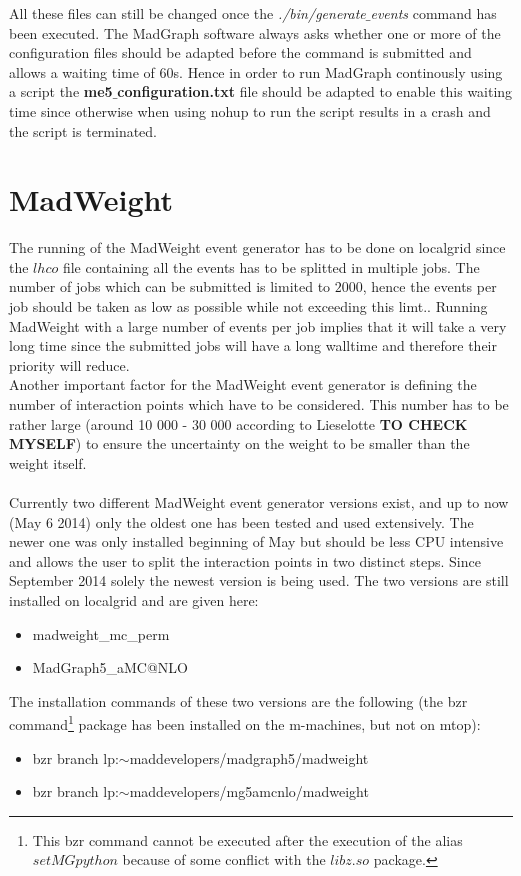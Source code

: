 All these files can still be changed once the \textit{./bin/generate$\_$events} command has been executed. The MadGraph software always asks whether one or more of the configuration files should be adapted before the command is submitted and allows a waiting time of 60s. Hence in order to run MadGraph continously using a script the \textbf{me5$\_$configuration.txt} file should be adapted to enable this waiting time since otherwise when using nohup to run the script results in a crash and the script is terminated.

\section{MadWeight}

The running of the MadWeight event generator has to be done on localgrid since the $lhco$ file containing all the events has to be splitted in multiple jobs. The number of jobs which can be submitted is limited to $2000$, hence the events per job should be taken as low as possible while not exceeding this limt.. Running MadWeight with a large number of events per job implies that it will take a very long time since the submitted jobs will have a long walltime and therefore their priority will reduce. \\
Another important factor for the MadWeight event generator is defining the number of interaction points which have to be considered. This number has to be rather large (around 10 000 - 30 000 according to Lieselotte \textbf{TO CHECK MYSELF}) to ensure the uncertainty on the weight to be smaller than the weight itself.\\
\\
Currently two different MadWeight event generator versions exist, and up to now (May 6 2014) only the oldest one has been tested and used extensively. The newer one was only installed beginning of May but should be less CPU intensive and allows the user to split the interaction points in two distinct steps. Since September 2014 solely the newest version is being used. The two versions are still installed on localgrid and are given here:
\begin{itemize}
  \item madweight\_mc\_perm
  \item MadGraph5\_aMC@NLO
\end{itemize}

The installation commands of these two versions are the following (the bzr command\footnote{This bzr command cannot be executed after the execution of the alias $setMGpython$ because of some conflict with the $libz.so$ package.} package has been installed on the m-machines, but not on mtop):
\begin{itemize}
  \item bzr branch lp:$\sim$maddevelopers/madgraph5/madweight 
  \item bzr branch lp:$\sim$maddevelopers/mg5amcnlo/madweight
\end{itemize}

